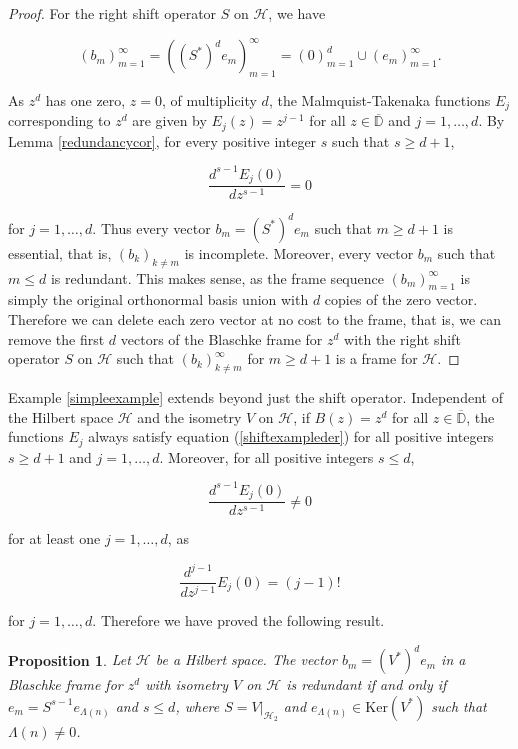 \documentclass[10pt, reqno]{amsart}
\newtheorem{proposition}[theorem]{Proposition}
\theoremstyle{definition}
\numberwithin{equation}{section}
\begin{document}
\begin{proof}
For the right shift operator $S$ on $\mathcal{H}$, we have 

$$(b_{m})_{m=1}^{\infty}=((S^{*})^{d}e_{m})_{m=1}^{\infty}=(0)_{m=1}^{d}\cup(e_{m})_{m=1}^{\infty}.$$

\noindent As $z^{d}$ has one zero, $z=0$, of multiplicity $d$, the Malmquist-Takenaka functions $E_{j}$ corresponding to $z^{d}$ are given by $E_{j}(z)=z^{j-1}$ for all $z\in{\overline{\mathbb{D}}}$ and $j=1,\hdots,d$. By Lemma \ref{redundancycor}, for every positive integer $s$ such that $s\geq d+1$, 

\begin{equation}\label{shiftexampleder}
\dfrac{d^{s-1}E_{j}(0)}{dz^{s-1}}=0
\end{equation}

\noindent for $j=1,\hdots,d$. Thus every vector $b_{m}=(S^{*})^{d}e_{m}$ such that $m\geq d+1$ is essential, that is, $(b_{k})_{k\neq m}$ is incomplete. Moreover, every vector $b_{m}$ such that $m\leq d$ is redundant. This makes sense, as the frame sequence $(b_{m})_{m=1}^{\infty}$ is simply the original orthonormal basis union with $d$ copies of the zero vector. Therefore we can delete each zero vector at no cost to the frame, that is, we can remove the first $d$ vectors of the Blaschke frame for $z^{d}$ with the right shift operator $S$ on $\mathcal{H}$ such that $(b_{k})_{k\neq m}^{\infty}$ for $m\geq d+1$ is a frame for $\mathcal{H}$.\end{proof}

 Example \ref{simpleexample} extends beyond just the shift operator. Independent of the Hilbert space $\mathcal{H}$ and the isometry $V$ on $\mathcal{H}$, if $B(z)=z^{d}$ for all $z\in\overline{\mathbb{D}}$, the functions $E_{j}$ always satisfy equation (\ref{shiftexampleder}) for all positive integers $s\geq d+1$ and $j=1,\hdots,d$. Moreover, for all positive integers $s\leq d$,

 $$\dfrac{d^{s-1}E_{j}(0)}{dz^{s-1}}\neq 0$$

 \noindent for at least one $j=1,\hdots,d$, as
 
 $$\dfrac{d^{j-1}}{dz^{j-1}}E_{j}(0)=(j-1)!$$
 
\noindent for $j=1,\hdots,d$. Therefore we have proved the following result.


\begin{proposition}\label{redundantforzd}
Let $\mathcal{H}$ be a Hilbert space. The vector $b_{m}=(V^{*})^{d}e_{m}$ in a Blaschke frame for $z^{d}$ with isometry $V$ on $\mathcal{H}$ is redundant if and only if $e_{m}=S^{s-1}e_{\Lambda(n)}$ and $s\leq d$, where $S=V|_{\mathcal{H}_{2}}$ and $e_{\Lambda(n)}\in\mathrm{Ker}(V^{*})$ such that $\Lambda(n)\neq 0$.
\end{proposition}
\end{document}
